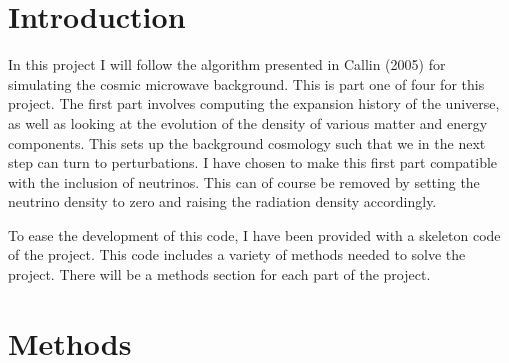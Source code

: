 \documentclass{aa}   %
\begin{document}
  


\section{Introduction}\label{sec:introduction}
In this project I will follow the algorithm presented in Callin (2005) for simulating the cosmic microwave background.  
This is part one of four for this project.
The first part involves computing the expansion history of the universe, as well as looking at the evolution of the density of various matter and energy components. This sets up the background cosmology such that we in the next step can turn to perturbations.
I have chosen to make this first part compatible with the inclusion of neutrinos.
This can of course be removed by setting the neutrino density to zero and raising the radiation density accordingly.

To ease the development of this code, I have been provided with a skeleton code of the project. 
This code includes a variety of methods needed to solve the project. There will be a methods section for each part of the project.
\section{Methods}\label{sec:Methods}
\end{document}
